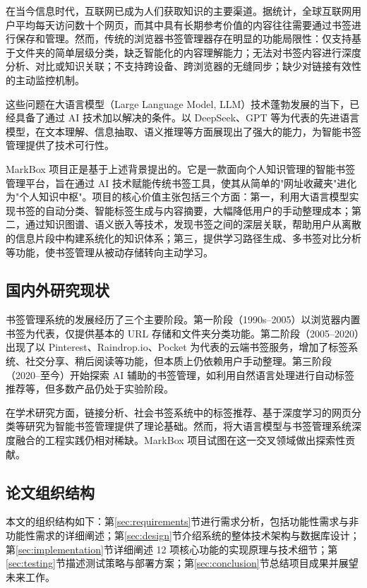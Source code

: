 \documentclass[12pt,a4paper]{ctexart}
\begin{document}
在当今信息时代，互联网已成为人们获取知识的主要渠道。据统计，全球互联网用户平均每天访问数十个网页，而其中具有长期参考价值的内容往往需要通过书签进行保存和管理\cite{ref:info-overload}。然而，传统的浏览器书签管理器存在明显的功能局限性：仅支持基于文件夹的简单层级分类，缺乏智能化的内容理解能力；无法对书签内容进行深度分析、对比或知识关联；不支持跨设备、跨浏览器的无缝同步；缺少对链接有效性的主动监控机制。

这些问题在大语言模型（Large Language Model, LLM）技术蓬勃发展的当下，已经具备了通过 AI 技术加以解决的条件。以 DeepSeek、GPT 等为代表的先进语言模型，在文本理解、信息抽取、语义推理等方面展现出了强大的能力，为智能书签管理提供了技术可行性。

MarkBox 项目正是基于上述背景提出的。它是一款面向个人知识管理的智能书签管理平台，旨在通过 AI 技术赋能传统书签工具，使其从简单的"网址收藏夹"进化为"个人知识中枢"。项目的核心价值主张包括三个方面：第一，利用大语言模型实现书签的自动分类、智能标签生成与内容摘要，大幅降低用户的手动整理成本；第二，通过知识图谱、语义嵌入等技术，发现书签之间的深层关联，帮助用户从离散的信息片段中构建系统化的知识体系；第三，提供学习路径生成、多书签对比分析等功能，使书签管理从被动存储转向主动学习。

\subsection{国内外研究现状}

书签管理系统的发展经历了三个主要阶段。第一阶段（1990s--2005）以浏览器内置书签为代表，仅提供基本的 URL 存储和文件夹分类功能。第二阶段（2005--2020）出现了以 Pinterest、Raindrop.io、Pocket 为代表的云端书签服务，增加了标签系统、社交分享、稍后阅读等功能，但本质上仍依赖用户手动整理。第三阶段（2020--至今）开始探索 AI 辅助的书签管理，如利用自然语言处理进行自动标签推荐等，但多数产品仍处于实验阶段。

在学术研究方面，链接分析\cite{ref:link-analysis}、社会书签系统中的标签推荐\cite{ref:tag-recommendation}、基于深度学习的网页分类\cite{ref:web-classification}等研究为智能书签管理提供了理论基础。然而，将大语言模型与书签管理系统深度融合的工程实践仍相对稀缺。MarkBox 项目试图在这一交叉领域做出探索性贡献。

\subsection{论文组织结构}

本文的组织结构如下：第\ref{sec:requirements}节进行需求分析，包括功能性需求与非功能性需求的详细阐述；第\ref{sec:design}节介绍系统的整体技术架构与数据库设计；第\ref{sec:implementation}节详细阐述 12 项核心功能的实现原理与技术细节；第\ref{sec:testing}节描述测试策略与部署方案；第\ref{sec:conclusion}节总结项目成果并展望未来工作。
\end{document}
